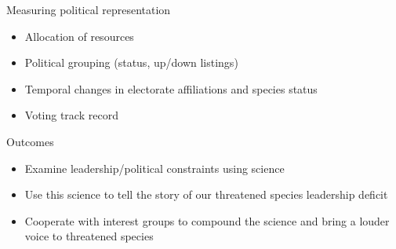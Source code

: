 \documentclass{beamer}
\begin{document}
\begin{frame}{Measuring political representation} %
    \begin{itemize}
        \item<2-> Allocation of resources
        \item<3-> Political grouping (status, up/down listings)
        \item<4-> Temporal changes in electorate affiliations and species status
        \item<5-> Voting track record
    \end{itemize}
\end{frame}

\begin{frame}{Outcomes} %
    \begin{itemize}
        \item Examine leadership/political constraints using science
        \item Use this science to tell the story of our threatened species leadership deficit
        \item Cooperate with interest groups to compound the science and bring a louder voice to threatened species
    \end{itemize}
\end{frame}
\end{document}
